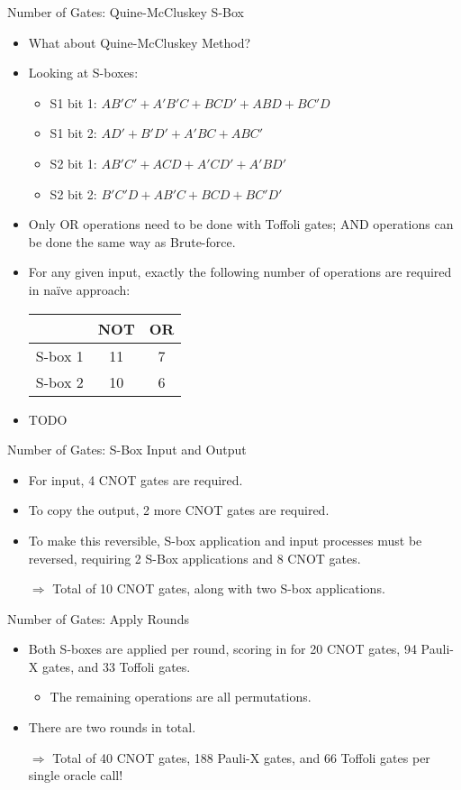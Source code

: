 \documentclass{beamer}
\begin{document}
	\begin{frame}{Number of Gates: Quine-McCluskey S-Box}
		\begin{itemize}
			\item What about Quine-McCluskey Method?
			\item Looking at S-boxes:
			\begin{itemize}
				\item S1 bit 1: $AB'C'+A'B'C+BCD'+ABD+BC'D$
				\item S1 bit 2: $AD'+B'D'+A'BC+ABC'$
				\item S2 bit 1: $AB'C'+ACD+A'CD'+A'BD'$
				\item S2 bit 2: $B'C'D+AB'C+BCD+BC'D'$
			\end{itemize}
			\item Only OR operations need to be done with Toffoli gates; AND operations can be done the same way as Brute-force.
			\item For any given input, exactly the following number of operations are required in naïve approach:
			\begin{center}
				\begin{tabular}{c|c|c}
					& NOT & OR \\\hline
					S-box 1 & 11      & 7      \\\hline
					S-box 2 & 10      & 6
				\end{tabular}
			\end{center}
			\item TODO
		\end{itemize}
	\end{frame}
	
	\begin{frame}{Number of Gates: S-Box Input and Output}
		\begin{itemize}
			\item For input, 4 CNOT gates are required.
			\item To copy the output, 2 more CNOT gates are required.
			\item To make this reversible, S-box application and input processes must be reversed, requiring 2 S-Box applications and 8 CNOT gates.
			\item[$\Rightarrow$] Total of 10 CNOT gates, along with two S-box applications.
		\end{itemize}
	\end{frame}
	
	\begin{frame}{Number of Gates: Apply Rounds}
		\begin{itemize}
			\item Both S-boxes are applied per round, scoring in for 20 CNOT gates, 94 Pauli-X gates, and 33 Toffoli gates.
			\begin{itemize}
				\item The remaining operations are all permutations.
			\end{itemize}
			\item There are two rounds in total.
			\item[$\Rightarrow$] Total of 40 CNOT gates, 188 Pauli-X gates, and 66 Toffoli gates per single oracle call!
		\end{itemize}
	\end{frame}
\end{document}
